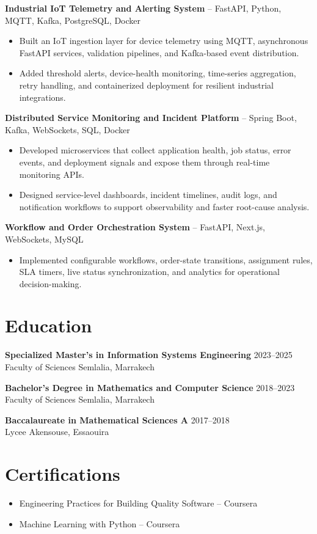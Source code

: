 \documentclass[11pt]{article}
\begin{document}
\textbf{Industrial IoT Telemetry and Alerting System} -- FastAPI, Python, MQTT, Kafka, PostgreSQL, Docker
\begin{itemize}
  \item Built an IoT ingestion layer for device telemetry using MQTT, asynchronous FastAPI services, validation pipelines, and Kafka-based event distribution.
  \item Added threshold alerts, device-health monitoring, time-series aggregation, retry handling, and containerized deployment for resilient industrial integrations.
\end{itemize}

\textbf{Distributed Service Monitoring and Incident Platform} -- Spring Boot, Kafka, WebSockets, SQL, Docker
\begin{itemize}
  \item Developed microservices that collect application health, job status, error events, and deployment signals and expose them through real-time monitoring APIs.
  \item Designed service-level dashboards, incident timelines, audit logs, and notification workflows to support observability and faster root-cause analysis.
\end{itemize}

\textbf{Workflow and Order Orchestration System} -- FastAPI, Next.js, WebSockets, MySQL
\begin{itemize}
  \item Implemented configurable workflows, order-state transitions, assignment rules, SLA timers, live status synchronization, and analytics for operational decision-making.
\end{itemize}

\section{Education}
\textbf{Specialized Master's in Information Systems Engineering} \hfill 2023--2025\\
Faculty of Sciences Semlalia, Marrakech

\textbf{Bachelor's Degree in Mathematics and Computer Science} \hfill 2018--2023\\
Faculty of Sciences Semlalia, Marrakech

\textbf{Baccalaureate in Mathematical Sciences A} \hfill 2017--2018\\
Lycee Akensouse, Essaouira

\section{Certifications}
\begin{itemize}
  \item Engineering Practices for Building Quality Software -- Coursera
  \item Machine Learning with Python -- Coursera
\end{itemize}
\end{document}
